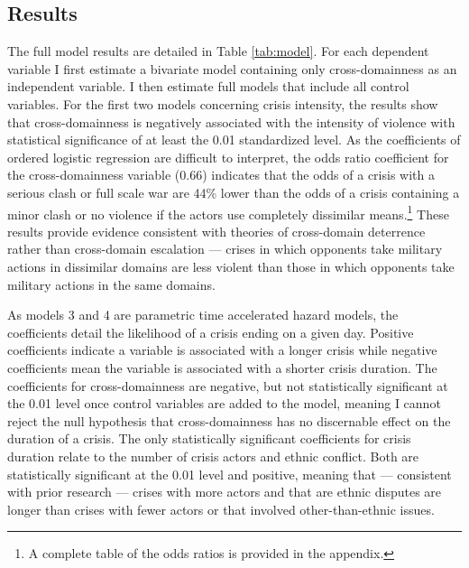 \documentclass[
]{article}
\begin{document}
\hypertarget{results}{%
\subsection{Results}\label{results}}

The full model results are detailed in Table \ref{tab:model}. For each dependent variable I first estimate a bivariate model containing only cross-domainness as an independent variable. I then estimate full models that include all control variables. For the first two models concerning crisis intensity, the results show that cross-domainness is negatively associated with the intensity of violence with statistical significance of at least the 0.01 standardized level. As the coefficients of ordered logistic regression are difficult to interpret, the odds ratio coefficient for the cross-domainness variable (0.66) indicates that the odds of a crisis with a serious clash or full scale war are 44\% lower than the odds of a crisis containing a minor clash or no violence if the actors use completely dissimilar means.\footnote{A complete table of the odds ratios is provided in the appendix.} These results provide evidence consistent with theories of cross-domain deterrence rather than cross-domain escalation --- crises in which opponents take military actions in dissimilar domains are less violent than those in which opponents take military actions in the same domains.

As models 3 and 4 are parametric time accelerated hazard models, the coefficients detail the likelihood of a crisis ending on a given day. Positive coefficients indicate a variable is associated with a longer crisis while negative coefficients mean the variable is associated with a shorter crisis duration. The coefficients for cross-domainness are negative, but not statistically significant at the 0.01 level once control variables are added to the model, meaning I cannot reject the null hypothesis that cross-domainness has no discernable effect on the duration of a crisis. The only statistically significant coefficients for crisis duration relate to the number of crisis actors and ethnic conflict. Both are statistically significant at the 0.01 level and positive, meaning that --- consistent with prior research --- crises with more actors and that are ethnic disputes are longer than crises with fewer actors or that involved other-than-ethnic issues.
\end{document}
